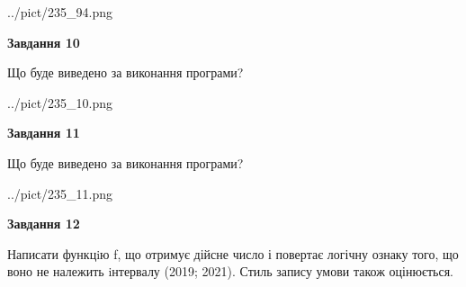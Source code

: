 \documentclass[12pt, ukrainian]{article}
\begin{document}
{\begin {large}
\begin{center}
	{../pict/235_94.png}
\end{center}
\newpage

{\begin {center}\textbf{Завдання 10}\end {center}}

Що буде виведено за виконання програми?\par
\begin{center}
	{../pict/235_10.png}
\end{center}
\newpage

{\begin {center}\textbf{Завдання 11}\end {center}}

Що буде виведено за виконання програми?\par
\begin{center}
	{../pict/235_11.png}
\end{center}
\newpage

{\begin {center}\textbf{Завдання 12}\end {center}}


Написати функцiю f, що отримує дійсне число і повертає логічну ознаку того, що воно не належить iнтервалу (2019; 2021). Стиль запису умови також оцінюється.\par
\newpage

\end {large}}
\end{document}
